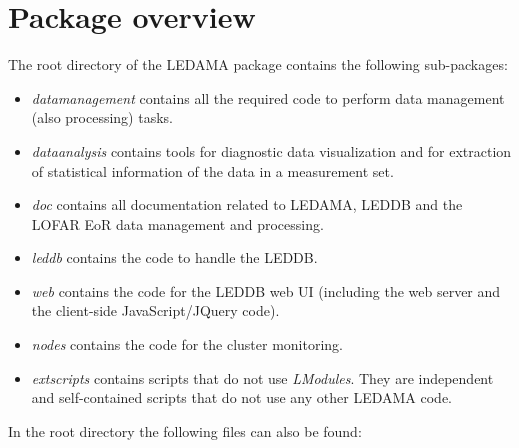 \documentclass[a4paper,11pt]{article}
\begin{document}
\section{Package overview}

The root directory of the LEDAMA package contains the following sub-packages:

\begin{itemize}
    \item \textit{datamanagement} contains all the required code to perform data management (also processing) tasks.
    \item \textit{dataanalysis} contains tools for diagnostic data visualization and for extraction of statistical information of the data in a measurement set.
    \item \textit{doc} contains all documentation related to LEDAMA, LEDDB and the LOFAR EoR data management and processing.
    \item \textit{leddb} contains the code to handle the LEDDB.
    \item \textit{web} contains the code for the LEDDB web UI (including the web server and the client-side JavaScript/JQuery code).
    \item \textit{nodes} contains the code for the cluster monitoring.
    \item \textit{extscripts} contains scripts that do not use \textit{LModules}. They are independent and self-contained scripts that do not use any other LEDAMA code.
\end{itemize}

In the root directory the following files can also be found:
\end{document}
